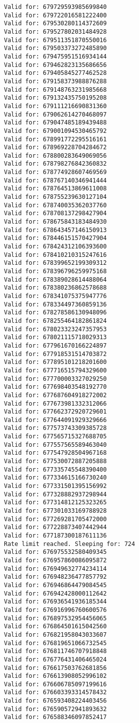 \documentclass[11pt]{article}
\begin{document}
\begin{Verbatim}[commandchars=\\\{\}]
Valid for: 679729593985699840
Valid for: 679722016581222400
Valid for: 679530280114372609
Valid for: 679527802031484928
Valid for: 679511351870550016
Valid for: 679503373272485890
Valid for: 679475951516934144
Valid for: 679462823135686656
Valid for: 679405845277462528
Valid for: 679158373988876288
Valid for: 679148763231985668
Valid for: 679132435750195208
Valid for: 679111216690831360
Valid for: 679062614270468097
Valid for: 679047485189439488
Valid for: 679001094530465792
Valid for: 678991772295516161
Valid for: 678969228704284672
Valid for: 678800283649069056
Valid for: 678798276842360832
Valid for: 678774928607469569
Valid for: 678767140346941444
Valid for: 678764513869611008
Valid for: 678755239630127104
Valid for: 678740035362037760
Valid for: 678708137298427904
Valid for: 678675843183484930
Valid for: 678643457146150913
Valid for: 678446151570427904
Valid for: 678424312106393600
Valid for: 678410210315247616
Valid for: 678399652199309312
Valid for: 678396796259975168
Valid for: 678389028614488064
Valid for: 678380236862578688
Valid for: 678341075375947776
Valid for: 678334497360859136
Valid for: 678278586130948096
Valid for: 678255464182861824
Valid for: 678023323247357953
Valid for: 678021115718029313
Valid for: 677961670166224897
Valid for: 677918531514703872
Valid for: 677895101218201600
Valid for: 677716515794329600
Valid for: 677700003327029250
Valid for: 677698403548192770
Valid for: 677687604918272002
Valid for: 677673981332312066
Valid for: 677662372920729601
Valid for: 677644091929329666
Valid for: 677573743309385728
Valid for: 677565715327688705
Valid for: 677557565589463040
Valid for: 677547928504967168
Valid for: 677530072887205888
Valid for: 677335745548390400
Valid for: 677334615166730240
Valid for: 677331501395156992
Valid for: 677328882937298944
Valid for: 677314812125323265
Valid for: 677301033169788928
Valid for: 677269281705472000
Valid for: 677228873407442944
Valid for: 677187300187611136
Rate limit reached. Sleeping for: 724
Valid for: 676975532580409345
Valid for: 676957860086095872
Valid for: 676949632774234114
Valid for: 676948236477857792
Valid for: 676946864479084545
Valid for: 676942428000112642
Valid for: 676936541936185344
Valid for: 676916996760600576
Valid for: 676897532954456065
Valid for: 676864501615042560
Valid for: 676821958043033607
Valid for: 676819651066732545
Valid for: 676811746707918848
Valid for: 676776431406465024
Valid for: 676617503762681856
Valid for: 676613908052996102
Valid for: 676606785097199616
Valid for: 676603393314578432
Valid for: 676593408224403456
Valid for: 676590572941893632
Valid for: 676588346097852417

\end{Verbatim}
\end{document}
